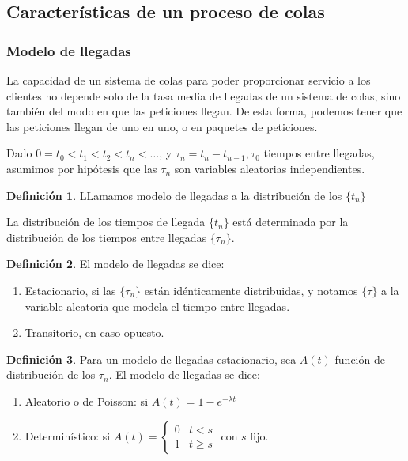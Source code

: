 \documentclass[a4paper,10pt]{scrartcl}
\theoremstyle{definition}
\newtheorem*{mydef}{Definición}
\numberwithin{equation}{section}
\begin{document}
\subsection{Características de un proceso de colas}
\subsubsection{Modelo de llegadas}
La capacidad de un sistema de colas para poder proporcionar servicio a los clientes no depende solo de la tasa media
de llegadas de un sistema de colas, sino también del modo en que las peticiones llegan. De esta forma, podemos
tener que las peticiones llegan de uno en uno, o en paquetes de peticiones.

Dado $0=t_0 < t_1 < t_2 < t_n < \ldots$, y $\tau_n = t_n - t_{n-1}, \tau_0$ tiempos entre llegadas, asumimos por hipótesis
que las $\tau_n$ son variables aleatorias independientes.

\begin{mydef}
LLamamos modelo de llegadas a la distribución de los $\{t_n\}$
\end{mydef}
 
 La distribución de los tiempos de llegada $\{t_n\}$ está determinada por la distribución de los tiempos entre
 llegadas $\{\tau_n\}$. 
 
\begin{mydef}
El modelo de llegadas se dice:
 
 \begin{enumerate}
   \item Estacionario, si las $\{\tau_n\}$ están idénticamente distribuidas, y notamos $\{\tau\}$ a la variable
   aleatoria que modela el tiempo entre llegadas.
   \item Transitorio, en caso opuesto.
 \end{enumerate}
\end{mydef}

 
\begin{mydef}
 Para un modelo de llegadas estacionario, sea $A(t)$ función de distribución de los $\tau_n$. 
 El modelo de llegadas se dice:

  \begin{enumerate}
  \item Aleatorio o de Poisson: si $A(t) = 1 - e^{-\lambda t}$
  \item Determinístico: si $A(t) = \left\{\begin{array}{ll}
					0 & t<s \\
					1 & t\ge s
					\end{array}\right.$ con $s$ fijo.
  
  \end{enumerate}
\end{mydef}
\end{document}
